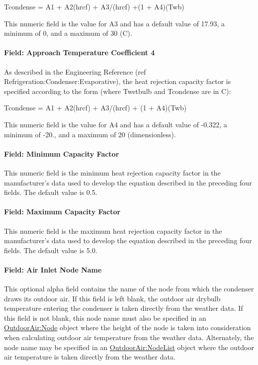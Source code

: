 Tcondense = A1 + A2(hrcf) + A3/(hrcf) +(1 + A4)(Twb)

This numeric field is the value for A3 and has a default value of 17.93, a minimum of 0, and a maximum of 30 (C).

\paragraph{Field: Approach Temperature Coefficient 4}\label{field-approach-temperature-coefficient-4}

As described in the Engineering Reference (ref Refrigeration:Condenser:Evaporative), the heat rejection capacity factor is specified according to the form (where Twetbulb and Tcondense are in C):

Tcondense = A1 + A2(hrcf) + A3/(hrcf) + (1 + A4)(Twb)

This numeric field is the value for A4 and has a default value of -0.322, a minimum of -20., and a maximum of 20 (dimensionless).

\paragraph{Field: Minimum Capacity Factor}\label{field-minimum-capacity-factor}

This numeric field is the minimum heat rejection capacity factor in the manufacturer's data used to develop the equation described in the preceding four fields. The default value is 0.5.

\paragraph{Field: Maximum Capacity Factor}\label{field-maximum-capacity-factor}

This numeric field is the maximum heat rejection capacity factor in the manufacturer's data used to develop the equation described in the preceding four fields. The default value is 5.0.

\paragraph{Field: Air Inlet Node Name}\label{field-air-inlet-node-name-005}

This optional alpha field contains the name of the node from which the condenser draws its outdoor air. If this field is left blank, the outdoor air drybulb temperature entering the condenser is taken directly from the weather data. If this field is not blank, this node name must also be specified in an \hyperref[outdoorairnode]{OutdoorAir:Node} object where the height of the node is taken into consideration when calculating outdoor air temperature from the weather data. Alternately, the node name may be specified in an \hyperref[outdoorairnodelist]{OutdoorAir:NodeList} object where the outdoor air temperature is taken directly from the weather data.

